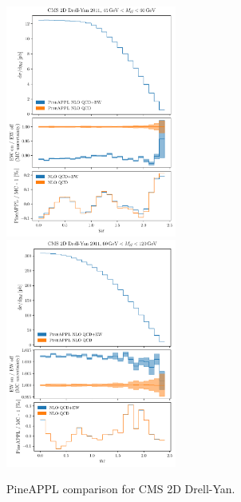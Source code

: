 \begin{figure}
    \centering
    \includegraphics[width=0.5\textwidth]{figures/pineappl_CMSDY2D11_bin3}%
    \includegraphics[width=0.5\textwidth]{figures/pineappl_CMSDY2D11_bin4}
    \caption{PineAPPL comparison for CMS 2D Drell-Yan.}
    \label{fig:cmsdy2d11_bins34}
\end{figure}


